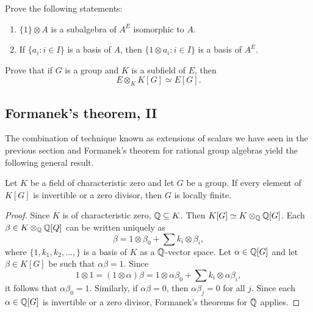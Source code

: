 \begin{exercise}
    Prove the following statements:
    \begin{enumerate}
		\item $\{1\}\otimes A$ is a subalgebra of $A^E$ isomorphic to $A$.
		\item If $\{a_i:i\in I\}$ is a basis of $A$, then $\{1\otimes a_i:i\in
			I\}$ is a basis of $A^E$.
	\end{enumerate}
\end{exercise}

\begin{exercise}
	Prove that if $G$ is a group and $K$ is a subfield of $E$, then
	\[
	E\otimes_K K[G]\simeq E[G].
	\]
\end{exercise}

\subsection{Formanek's theorem, II}

The combination of technique known as extensions of scalars we have seen in the previous section
and Formanek's theorem for rational group algebras 
yield the following general result. 

\begin{theorem}[Formanek]
	Let $K$ be a field of characteristic zero and let $G$ be a group. 
	If every element of $K[G]$ is invertible or a zero divisor, 
	then $G$ is locally finite. 
\end{theorem}

\begin{proof}
	Since $K$ is of characteristic zero, $\mathbb{Q}\subseteq K$. Then $K[G]\simeq
	K\otimes_{\mathbb{Q}}\mathbb{Q}[G]$. Each $\beta\in K\otimes_{\mathbb{Q}}\mathbb{Q}[Q]$ can be written
	uniquely as 
	\[
		\beta=1\otimes\beta_0+\sum k_i\otimes\beta_i,
	\]
	where $\{1,k_1,k_2,\dots,\}$ is a basis of $K$ as a $\mathbb{Q}$-vector space. 
	Let $\alpha\in\mathbb{Q}[G]$ and let $\beta\in K[G]$ be such that $\alpha\beta=1$. Since
	\[
	1\otimes 1=(1\otimes\alpha)\beta=1\otimes \alpha\beta_0+\sum k_i\otimes \alpha\beta_i,
	\]
	it follows that $\alpha\beta_0=1$. Similarly, if
	$\alpha\beta=0$, then $\alpha\beta_j=0$ for all $j$. Since 
	each $\alpha\in\mathbb{Q}[G]$ is invertible or a zero divisor, Formanek's theorems 
	for $\mathbb{Q}$ applies. 
\end{proof}


